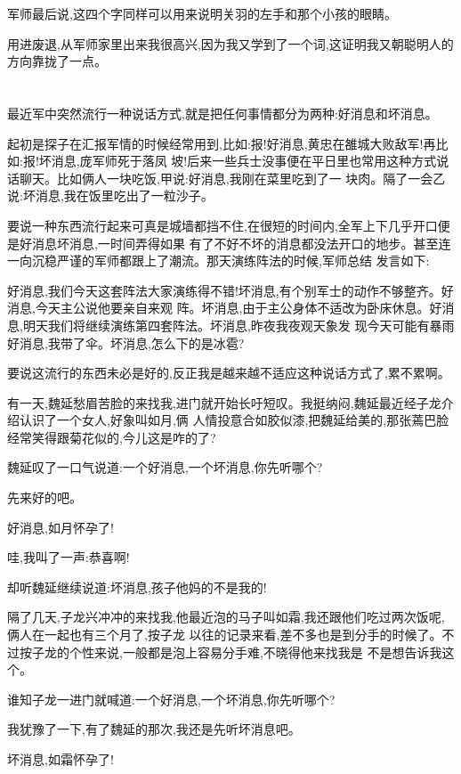 ﻿\documentclass[12pt,twocolumn]{article}
\begin{document}
军师最后说,这四个字同样可以用来说明关羽的左手和那个小孩的眼睛。

用进废退,从军师家里出来我很高兴,因为我又学到了一个词,这证明我又朝聪明人的方向靠拢了一点。

\section{}

最近军中突然流行一种说话方式,就是把任何事情都分为两种:好消息和坏消息。

起初是探子在汇报军情的时候经常用到,比如:报!好消息,黄忠在雒城大败敌军!再比如:报!坏消息,庞军师死于落凤
坡!后来一些兵士没事便在平日里也常用这种方式说话聊天。比如俩人一块吃饭,甲说:好消息,我刚在菜里吃到了一
块肉。隔了一会乙说:坏消息,我在饭里吃出了一粒沙子。

要说一种东西流行起来可真是城墙都挡不住,在很短的时间内,全军上下几乎开口便是好消息坏消息,一时间弄得如果
有了不好不坏的消息都没法开口的地步。甚至连一向沉稳严谨的军师都跟上了潮流。那天演练阵法的时候,军师总结
发言如下:

好消息,我们今天这套阵法大家演练得不错!坏消息,有个别军士的动作不够整齐。好消息,今天主公说他要亲自来观
阵。坏消息,由于主公身体不适改为卧床休息。好消息,明天我们将继续演练第四套阵法。坏消息,昨夜我夜观天象发
现今天可能有暴雨\dldots 好消息,我带了伞。坏消息,怎么\dldots 下的是冰雹?

要说这流行的东西未必是好的,反正我是越来越不适应这种说话方式了,累不累啊。

有一天,魏延愁眉苦脸的来找我,进门就开始长吁短叹。我挺纳闷,魏延最近经子龙介绍认识了一个女人,好象叫如月,俩
人情投意合如胶似漆,把魏延给美的,那张蔫巴脸经常笑得跟菊花似的,今儿这是咋的了?

魏延叹了一口气说道:一个好消息,一个坏消息,你先听哪个?

先来好的吧。

好消息,如月怀孕了!

哇,我叫了一声:恭喜啊!

却听魏延继续说道:坏消息,孩子他妈的不是我的!

隔了几天,子龙兴冲冲的来找我,他最近泡的马子叫如霜,我还跟他们吃过两次饭呢,俩人在一起也有三个月了,按子龙
以往的记录来看,差不多也是到分手的时候了。不过按子龙的个性来说,一般都是泡上容易分手难,不晓得他来找我是
不是想告诉我这个。

谁知子龙一进门就喊道:一个好消息,一个坏消息,你先听哪个?

我犹豫了一下,有了魏延的那次,我还是先听坏消息吧。

坏消息,如霜怀孕了!
\end{document}
